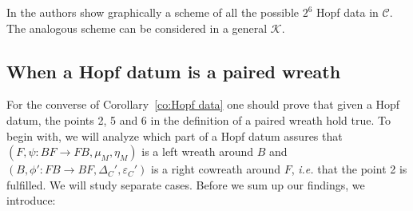 \documentclass[a4paper, 12pt]{article}
\renewcommand{\_}[1]{\mbox{$_{\left( #1 \right)}$}}
\theoremstyle{plain}
\newcommand{\C}{{\mathcal C}}
\newcommand{\Epsilon}{\varepsilon}
\def\K{{\mathcal K}}  %
\newcommand{\equref}[1]{(\ref{eq:#1})}
\newcommand{\coref}[1]{Corollary~\ref{co:#1}}
\begin{document}
In \cite[Section 4]{BD} the authors show graphically a scheme of all the possible $2^6$ Hopf data in $\C$. The analogous scheme can be considered in a general $\K$. 



\subsection{When a Hopf datum is a paired wreath}


For the converse of \coref{Hopf data} one should prove that given a Hopf datum, the points 2, 5 and 6 in the definition of a paired wreath hold true. 
To begin with, we will analyze which part of a Hopf datum assures that 
$(F, \psi: BF\to FB, \mu_M, \eta_M)$ is a left wreath around $B$ and $(B, \phi': FB\to BF, \Delta_C', \Epsilon_C')$ is a right cowreath around $F$, 
{\em i.e.} that the point 2 is fulfilled. We will study separate cases. %
Before we sum up our findings, we introduce: 
\end{document}
